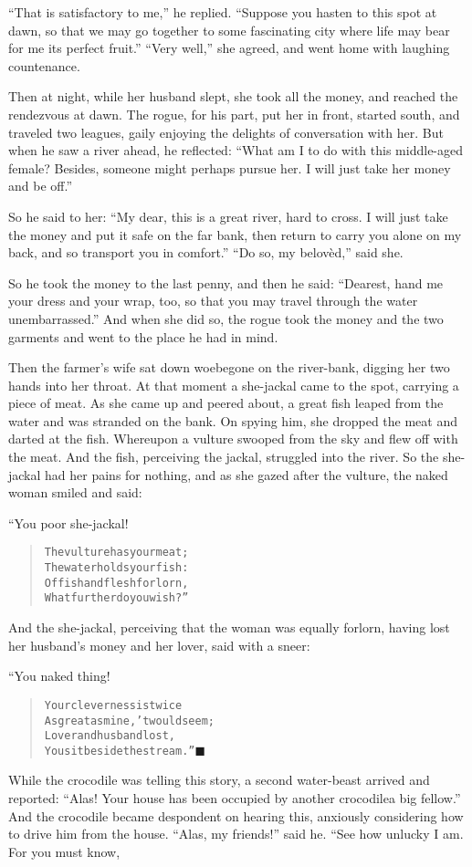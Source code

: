 \documentclass[article, twoside, 14pt]{memoir}
\newcommand{\qed}{\hfill \ensuremath{\blacksquare}}
\renewenvironment{verbatim}{%
\begin{quote}%
\vskip -10pt%
\begin{alltt}\normalfont\large}{\end{alltt}%
\end{quote}%
\vskip -10pt
} %
\begin{document}
``That is satisfactory to me,'' he replied.
``Suppose you hasten to this spot at dawn, so that we may go together to some fascinating city where life may bear for me its perfect fruit.''
``Very well,'' she agreed, and went home with laughing
countenance.

Then at night, while her husband slept, she took all the money, and
reached the rendezvous at dawn. The rogue, for his part, put her in
front, started south, and traveled two leagues, gaily enjoying the
delights of conversation with her. But when he saw a river ahead,
he reflected:
``What am I to do with this middle-aged female? Besides, someone might perhaps pursue her. I will just take her money and be off.''

So he said to her:
``My dear, this is a great river, hard to cross. I will just take the money and put it safe on the far bank, then return to carry you alone on my back, and so transport you in comfort.''
``Do so, my belovèd,'' said she.

So he took the money to the last penny, and then he said:
``Dearest, hand me your dress and your wrap, too, so that you may travel through the water unembarrassed.''
And when she did so, the rogue took the money and the two garments
and went to the place he had in mind.

Then the farmer's wife sat down woebegone on the river-bank,
digging her two hands into her throat. At that moment a she-jackal
came to the spot, carrying a piece of meat. As she came up and
peered about, a great fish leaped from the water and was stranded
on the bank. On spying him, she dropped the meat and darted at the
fish. Whereupon a vulture swooped from the sky and flew off with
the meat. And the fish, perceiving the jackal, struggled into the
river. So the she-jackal had her pains for nothing, and as she
gazed after the vulture, the naked woman smiled and said:

“You poor she-jackal!

\begin{verbatim}
The vulture has your meat;
    The water holds your fish:
Of fish and flesh forlorn,
    What further do you wish?”
\end{verbatim}
And the she-jackal, perceiving that the woman was equally forlorn,
having lost her husband's money and her lover, said with a sneer:

“You naked thing!

\begin{verbatim}
Your cleverness is twice
    As great as mine, 'twould seem;
Lover and husband lost,
    You sit beside the stream.”\hyperref[s74]{\qed}
\end{verbatim}
While the crocodile was telling this story, a second water-beast
arrived and reported:
``Alas! Your house has been occupied by another crocodile{\textemdash}a big fellow.''
And the crocodile became despondent on hearing this, anxiously
considering how to drive him from the house. ``Alas, my friends!''
said he. “See how unlucky I am. For you must know,
\end{document}
